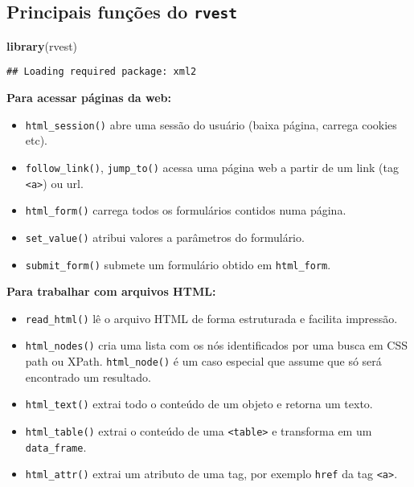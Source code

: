 \documentclass[]{book}
\newenvironment{Shaded}{\begin{snugshade}}{\end{snugshade}}
\newcommand{\KeywordTok}[1]{\textcolor[rgb]{0.13,0.29,0.53}{\textbf{{#1}}}}
\newcommand{\NormalTok}[1]{{#1}}
\providecommand{\tightlist}{%
  \setlength{\itemsep}{0pt}\setlength{\parskip}{0pt}}
\begin{document}
\subsection{\texorpdfstring{Principais funções do
\texttt{rvest}}{Principais funções do rvest}}\label{principais-funcoes-do-rvest}

\begin{Shaded}
\begin{Highlighting}[]
\KeywordTok{library}\NormalTok{(rvest)}
\end{Highlighting}
\end{Shaded}

\begin{verbatim}
## Loading required package: xml2
\end{verbatim}

\textbf{Para acessar páginas da web:}

\begin{itemize}
\tightlist
\item
  \texttt{html\_session()} abre uma sessão do usuário (baixa página,
  carrega cookies etc).
\item
  \texttt{follow\_link()}, \texttt{jump\_to()} acessa uma página web a
  partir de um link (tag \texttt{\textless{}a\textgreater{}}) ou url.
\item
  \texttt{html\_form()} carrega todos os formulários contidos numa
  página.
\item
  \texttt{set\_value()} atribui valores a parâmetros do formulário.
\item
  \texttt{submit\_form()} submete um formulário obtido em
  \texttt{html\_form}.
\end{itemize}

\textbf{Para trabalhar com arquivos HTML:}

\begin{itemize}
\tightlist
\item
  \texttt{read\_html()} lê o arquivo HTML de forma estruturada e
  facilita impressão.
\item
  \texttt{html\_nodes()} cria uma lista com os nós identificados por uma
  busca em CSS path ou XPath. \texttt{html\_node()} é um caso especial
  que assume que só será encontrado um resultado.
\item
  \texttt{html\_text()} extrai todo o conteúdo de um objeto e retorna um
  texto.
\item
  \texttt{html\_table()} extrai o conteúdo de uma
  \texttt{\textless{}table\textgreater{}} e transforma em um
  \texttt{data\_frame}.
\item
  \texttt{html\_attr()} extrai um atributo de uma tag, por exemplo
  \texttt{href} da tag \texttt{\textless{}a\textgreater{}}.
\end{itemize}
\end{document}
